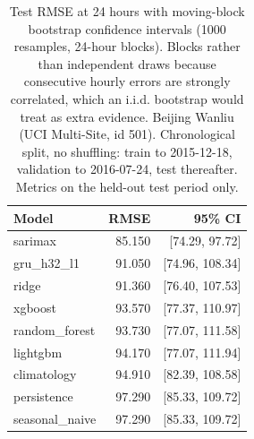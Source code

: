 \begin{table}[htbp]
\caption{Test RMSE at 24 hours with moving-block bootstrap confidence intervals (1000 resamples, 24-hour blocks). Blocks rather than independent draws because consecutive hourly errors are strongly correlated, which an i.i.d. bootstrap would treat as extra evidence. Beijing Wanliu (UCI Multi-Site, id 501). Chronological split, no shuffling: train to 2015-12-18, validation to 2016-07-24, test thereafter. Metrics on the held-out test period only.}
\label{tab:bootstrap_ci}
\begin{tabular}{lrr}
\toprule
Model & RMSE & 95\% CI \\
\midrule
sarimax & 85.150 & [74.29, 97.72] \\
gru\_h32\_l1 & 91.050 & [74.96, 108.34] \\
ridge & 91.360 & [76.40, 107.53] \\
xgboost & 93.570 & [77.37, 110.97] \\
random\_forest & 93.730 & [77.07, 111.58] \\
lightgbm & 94.170 & [77.07, 111.94] \\
climatology & 94.910 & [82.39, 108.58] \\
persistence & 97.290 & [85.33, 109.72] \\
seasonal\_naive & 97.290 & [85.33, 109.72] \\
\bottomrule
\end{tabular}
\end{table}
